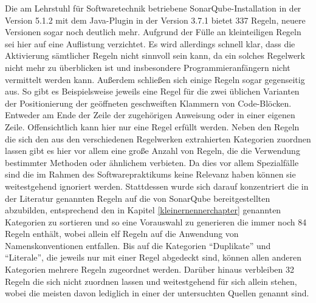 \documentclass[da,ngerman]{stthesis}
\begin{document}
			Die am Lehrstuhl für Softwaretechnik betriebene SonarQube-Installation in der Version 5.1.2 mit dem Java-Plugin in der Version 3.7.1 bietet 337 Regeln, neuere Versionen sogar noch deutlich mehr. Aufgrund der Fülle an kleinteiligen Regeln sei hier auf eine Auflistung verzichtet. Es wird allerdings schnell klar, dass die Aktivierung sämtlicher Regeln nicht sinnvoll sein kann, da ein solches Regelwerk nicht mehr zu überblicken ist und insbesondere Programmieranfängern nicht vermittelt werden kann. Außerdem schließen sich einige Regeln sogar gegenseitig aus. So gibt es Beispielsweise jeweils eine Regel für die zwei üblichen Varianten der Positionierung der geöffneten geschweiften Klammern von Code-Blöcken. Entweder am Ende der Zeile der zugehörigen Anweisung oder in einer eigenen Zeile. Offensichtlich kann hier nur eine Regel erfüllt werden. Neben den Regeln die sich den aus den verschiedenen Regelwerken extrahierten Kategorien zuordnen lassen gibt es hier vor allem eine große Anzahl von Regeln, die die Verwendung bestimmter Methoden oder ähnlichem verbieten. Da dies vor allem Spezialfälle sind die im Rahmen des Softwarepraktikums keine Relevanz haben können sie weitestgehend ignoriert werden. \newline
			Stattdessen wurde sich darauf konzentriert die in der Literatur genannten Regeln auf die von SonarQube bereitgestellten abzubilden, entsprechend den in Kapitel \ref{kleinernennerchapter} genannten Kategorien zu sortieren und so eine Vorauswahl zu generieren die immer noch 84 Regeln enthält, wobei allein elf Regeln auf die Anwendung von Namenskonventionen entfallen. Bis auf die Kategorien "`Duplikate"' und "`Literale"', die jeweils nur mit einer Regel abgedeckt sind, können allen anderen Kategorien mehrere Regeln zugeordnet werden. Darüber hinaus verbleiben 32 Regeln die sich nicht zuordnen lassen und weitestgehend für sich allein stehen, wobei die meisten davon lediglich in einer der untersuchten Quellen genannt sind.\newline
\end{document}
